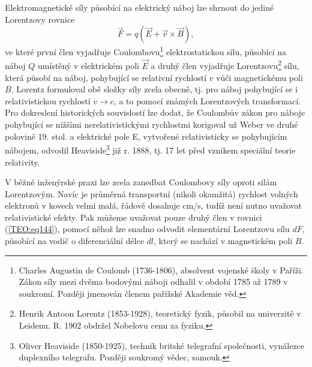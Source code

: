       Elektromagnetické síly působící na elektrický náboj lze shrnout do jediné Lorentzovy rovnice
      \begin{equation}\label{TEO:eq144}
        \vec{F}=q(\vec{E}+\vec{v}\times\vec{B}),
      \end{equation}
      ve které první člen vyjadřuje Coulombovu\footnote{Charles Augustin de Coulomb (1736-1806), 
      absolvent vojenské školy v Paříži. Zákon síly mezi dvěma bodovými náboji odhalil v období 
      1785 až 1789 v soukromí. Později jmenován členem pařížské Akademie věd.} elektrostatickou 
      sílu, působící na náboj \(Q\) umístěný v elektrickém poli \(\vec{E}\) a druhý člen vyjadřuje 
      Lorentzovu\footnote{Henrik Antoon Lorentz (1853-1928), teoretický fyzik, působil na 
      univerzitě v Leidenu. R. 1902 obdržel Nobelovu cenu za fyziku.} sílu, která působí na 
      náboj, pohybující se relativní rychlostí \(v\) vůči magnetickému poli \(B\). Lorentz 
      formuloval obě složky síly zcela obecně, tj. pro náboj pohybující se i relativistickou 
      rychlostí \(v \rightarrow c\), a to pomocí známých Lorentzových transformací. Pro 
      dokreslení historických souvislostí lze dodat, že Coulombův zákon pro náboje pohybující se 
      nižšími nerelativistickými rychlostmi korigoval už Weber ve druhé polovině 19. stol.
      a elektrické pole E, vytvořené relativisticky se pohybujícím nábojem, odvodil 
      Heaviside\footnote{Oliver Heaviside (1850-1925), technik britské telegrafní společnosti, 
      vynálezce duplexního telegrafu. Později soukromý vědec, samouk.} již r. 1888, tj. 17 let před 
      vznikem speciální teorie relativity. 
      
      V běžné inženýrské praxi lze zcela zanedbat Coulombovy síly oproti silám Lorentzovým. Navíc 
      je průměrná transportní (nikoli okamžitá) rychlost volných elektronů v kovech velmi malá, 
      řádově dosahuje \si{\cm/\s}, tudíž není nutno uvažovat relativistické efekty. Pak 
      můžeme uvažovat pouze druhý člen v rovnici (\ref{TEO:eq144}), pomocí něhož lze snadno 
      odvodit elementární Lorentzovu sílu \(dF\), působící na vodič o diferenciální délce \(dl\), 
      který se nachází v magnetickém poli \(B\).
       

